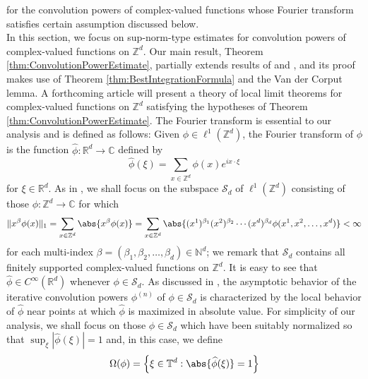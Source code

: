 \documentclass[11pt, letter]{book}
\begin{document}
for the convolution powers of complex-valued functions whose Fourier transform satisfies certain assumption discussed below.  \\

\noindent In this section, we focus on sup-norm-type estimates for convolution powers of complex-valued functions on $\mathbb{Z}^d$. Our main result, Theorem \ref{thm:ConvolutionPowerEstimate}, partially extends results of \cite{randles_convolution_2015} and \cite{randles_convolution_2017}, and its proof makes use of Theorem \ref{thm:BestIntegrationFormula} and the Van der Corput lemma. A forthcoming article will present a theory of local limit theorems for complex-valued functions on $\mathbb{Z}^d$ satisfying the hypotheses of Theorem \ref{thm:ConvolutionPowerEstimate}. The Fourier transform is essential to our analysis and is defined as follows: Given $\phi\in\ell^1(\mathbb{Z}^d)$, the Fourier transform of $\phi$ is the function $\widehat{\phi}:\mathbb{R}^d\to\mathbb{C}$ defined by
\begin{equation*}
    \widehat{\phi}(\xi)=\sum_{x\in\mathbb{Z}^d}\phi(x)e^{ix\cdot\xi}
\end{equation*}
for $\xi\in\mathbb{R}^d$. As in \cite{randles_convolution_2017}, we shall focus on the subspace $\mathcal{S}_d$ of $\ell^1(\mathbb{Z}^d)$ consisting of those $\phi:\mathbb{Z}^d\to\mathbb{C}$ for which
\begin{equation*}
    \|x^\beta \phi(x)\|_1=\sum_{x\in\mathbb{Z}^d}\abs{x^\beta\phi(x)}=\sum_{x\in\mathbb{Z}^d}\abs{(x^1)^{\beta_1}(x^2)^{\beta_2}\cdots(x^d)^{\beta_d}\phi(x^1,x^2,\dots,x^d)}<\infty
\end{equation*}
for each multi-index $\beta=(\beta_1,\beta_2,\dots,\beta_d)\in\mathbb{N}^d$; we remark that $\mathcal{S}_d$ contains all finitely supported complex-valued functions on $\mathbb{Z}^d$.  It is easy to see that $\widehat{\phi}\in C^\infty(\mathbb{R}^d)$ whenever $\phi\in \mathcal{S}_d$. As discussed in \cite{thomee_stability_1965,diaconis_convolution_2014,randles_convolution_2015,randles_convolution_2017}, the asymptotic behavior of the iterative convolution powers $\phi^{(n)}$ of $\phi\in\mathcal{S}_d$ is characterized by the local behavior of $\widehat{\phi}$ near points at which $\widehat{\phi}$ is maximized in absolute value. For simplicity of our analysis, we shall focus on those $\phi\in\mathcal{S}_d$ which have been suitably normalized so that $\sup_{\xi}|\widehat{\phi}(\xi)|=1$ and, in this case, we define
\begin{equation*}
    \Omega(\phi)=\left\{\xi\in \mathbb{T}^d:\abs{\widehat{\phi}(\xi)}=1\right\}
\end{equation*}
\end{document}
